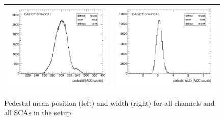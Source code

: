 \documentclass[a4paper,11pt]{article}
\begin{document}
\begin{figure}[!t]
  \centering
  \begin{tabular}{ll}
    \includegraphics[width=2.8in]{h_ped_mean_notitle-eps-converted-to.pdf} & \includegraphics[width=2.8in]{h_ped_width_notitle-eps-converted-to.pdf} 
  \end{tabular}
  \caption{Pedestal mean position (left) and width (right) for all channels and all SCAs in the setup.}
\label{pedestal_all}
\end{figure}
\end{document}
